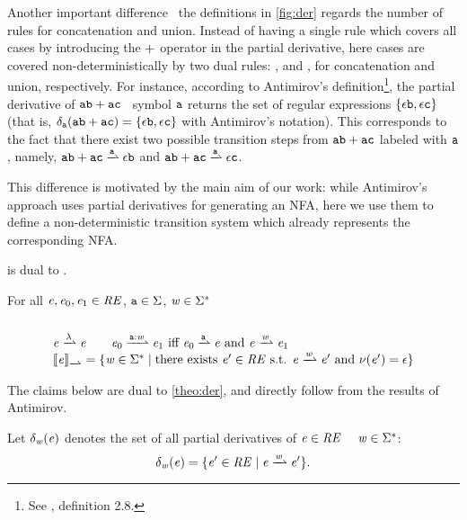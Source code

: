 Another important difference \wrt\ the definitions in \cref{fig:der} regards the number of rules for concatenation and union. Instead of having a single rule which covers all cases by introducing the $\mathbin{+}$ operator in the partial derivative, here cases are covered non-deterministically by two dual rules: ,  and ,   for concatenation and union, respectively.
For instance, according to Antimirov's definition\footnote{See \cite{Antimirov96}, definition 2.8.},
the partial derivative of $\mathtt {a} \mathtt {b} \mathbin{+} \mathtt {a}\mathtt {c}$ \wrt~symbol $\mathtt {a} $ returns the set of regular expressions $\{\mathtt {\epsilon}\mathtt {b},\mathtt {\epsilon}\mathtt {c}\}$ (that is, $\delta_{\mathtt {a}}(\mathtt {a}\mathtt {b} \mathbin{+} \mathtt {a}\mathtt {c})=\{\mathtt {\epsilon}\mathtt {b},\mathtt {\epsilon}\mathtt {c}\}$ with Antimirov's notation). This corresponds to the fact that there exist two possible transition steps from $\mathtt {a} \mathtt {b} \mathbin{+} \mathtt {a}\mathtt {c}$ labeled with $\mathtt {a} $, namely,
$\sym \asym \orop \sym\yasym\parDer{\sym}\eps\catop\asym$ and $\sym \asym \orop \sym \yasym\parDer{\sym}\eps\catop\yasym$.

This difference is motivated by the main aim of our work: while Antimirov's approach uses partial derivatives for generating an NFA, here
we use them to define a non-deterministic transition system which already represents the corresponding NFA.

 is dual to .
\begin{definition}\label{def:parDer}
 For all $\mathit {e},\mathit {e}_0,\mathit {e}_1\in\mathit {RE}$, $\mathtt {a}\in\Sigma$, $\mathit {w}\in\Sigma^*$
 \[
  \begin{array}{l}
   \\
   \re\parDer{\emptyWord}\re                                                                                       \qquad
   \re_0\parDer{\sym\strcons\word}\re_1 \mbox{ iff } \re_0\parDer{\sym}{}\re \mbox{ and } \re\parDer{\word}{}\re_1 \\
   \opSem{\re}{\parDer{}}=\{\word\in\symAlph^* \mid \mbox{there exists } \re'\in\reSet \mbox{ s.t. } \re\parDer{\word}\re' \mbox{ and } \hasEps{\re'}=\eps\}
  \end{array}
 \]
\end{definition}

The claims below are dual to \cref{theo:der}, and  directly follow from the results of Antimirov.

Let $\delta_{\mathit {w}}(\mathit {e})$ denotes the set of all partial derivatives of $\mathit {e}\in\mathit {RE}$ \wrt~ $\mathit {w}\in\Sigma^*$:
\[
 \delta_\word(\re)=\{\re'\in\reSet \mid \re\parDer{\word}\re'\}.
\]


